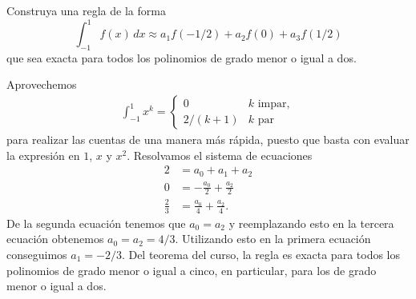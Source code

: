 \begin{statement}{5}
  Construya una regla de la forma
  \[
    \int_{-1}^1 f(x) \, dx \approx a_1 f(-1/2) + a_2 f(0) + a_3 f(1/2)
  \]
  que sea exacta para todos los polinomios de grado menor o igual a dos.
\end{statement}

\begin{solution}
  Aprovechemos
  \begin{align*}
    \int_{-1}^1 x^k =
    \begin{cases}
      0 & k \text{ impar},\\
      2 / (k + 1) & k \text{ par}
    \end{cases}
  \end{align*}
  para realizar las cuentas de una manera m\'as r\'apida, puesto que basta con
  evaluar la expresi\'on en $1$, $x$ y $x^2$. Resolvamos el sistema de ecuaciones
  \begin{align*}
    2 &= a_0 + a_1 + a_2\\
    0 &= -\frac{a_0}{2} + \frac{a_2}{2}\\
    \frac{2}{3} &= \frac{a_0}{4} + \frac{a_2}{4}.
  \end{align*}
  De la segunda ecuaci\'on tenemos que $a_0 = a_2$ y
  reemplazando esto en la tercera ecuaci\'on obtenemos $a_0 = a_2 = 4 / 3$.
  Utilizando esto en la primera ecuaci\'on conseguimos $a_1 = -2/3$.
  Del teorema del curso, la regla es exacta para todos los polinomios de grado
  menor o igual a cinco, en particular, para los de grado menor o igual a dos.
\end{solution}
